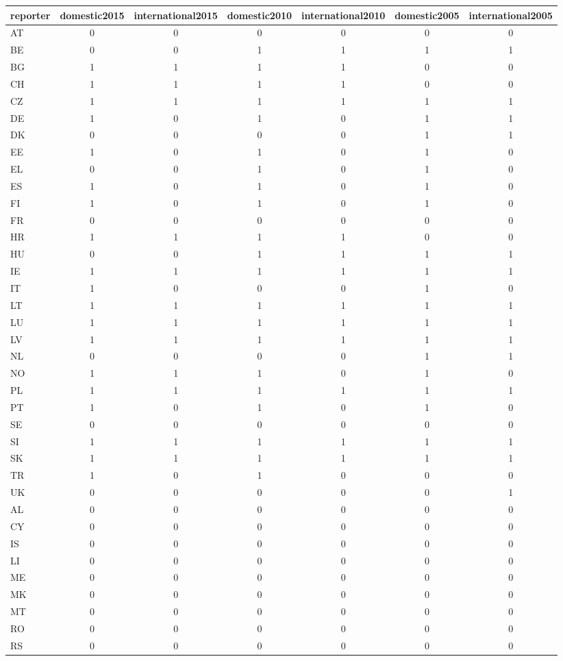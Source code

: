 \documentclass[]{article}
\begin{document}
\begin{tabular}{lcccccc} \hline
reporter & domestic2015 & international2015 & domestic2010 & international2010 & domestic2005 & international2005 \\ \hline
AT & 0 & 0 & 0 & 0 & 0 & 0 \\
BE & 0 & 0 & 1 & 1 & 1 & 1 \\
BG & 1 & 1 & 1 & 1 & 0 & 0 \\
CH & 1 & 1 & 1 & 1 & 0 & 0 \\
CZ & 1 & 1 & 1 & 1 & 1 & 1 \\
DE & 1 & 0 & 1 & 0 & 1 & 1 \\
DK & 0 & 0 & 0 & 0 & 1 & 1 \\
EE & 1 & 0 & 1 & 0 & 1 & 0 \\
EL & 0 & 0 & 1 & 0 & 1 & 0 \\
ES & 1 & 0 & 1 & 0 & 1 & 0 \\
FI & 1 & 0 & 1 & 0 & 1 & 0 \\
FR & 0 & 0 & 0 & 0 & 0 & 0 \\
HR & 1 & 1 & 1 & 1 & 0 & 0 \\
HU & 0 & 0 & 1 & 1 & 1 & 1 \\
IE & 1 & 1 & 1 & 1 & 1 & 1 \\
IT & 1 & 0 & 0 & 0 & 1 & 0 \\
LT & 1 & 1 & 1 & 1 & 1 & 1 \\
LU & 1 & 1 & 1 & 1 & 1 & 1 \\
LV & 1 & 1 & 1 & 1 & 1 & 1 \\
NL & 0 & 0 & 0 & 0 & 1 & 1 \\
NO & 1 & 1 & 1 & 0 & 1 & 0 \\
PL & 1 & 1 & 1 & 1 & 1 & 1 \\
PT & 1 & 0 & 1 & 0 & 1 & 0 \\
SE & 0 & 0 & 0 & 0 & 0 & 0 \\
SI & 1 & 1 & 1 & 1 & 1 & 1 \\
SK & 1 & 1 & 1 & 1 & 1 & 1 \\
TR & 1 & 0 & 1 & 0 & 0 & 0 \\
UK & 0 & 0 & 0 & 0 & 0 & 1 \\
AL & 0 & 0 & 0 & 0 & 0 & 0 \\
CY & 0 & 0 & 0 & 0 & 0 & 0 \\
IS & 0 & 0 & 0 & 0 & 0 & 0 \\
LI & 0 & 0 & 0 & 0 & 0 & 0 \\
ME & 0 & 0 & 0 & 0 & 0 & 0 \\
MK & 0 & 0 & 0 & 0 & 0 & 0 \\
MT & 0 & 0 & 0 & 0 & 0 & 0 \\
RO & 0 & 0 & 0 & 0 & 0 & 0 \\
 RS & 0 & 0 & 0 & 0 & 0 & 0 \\ \hline
\end{tabular}
\end{document}
